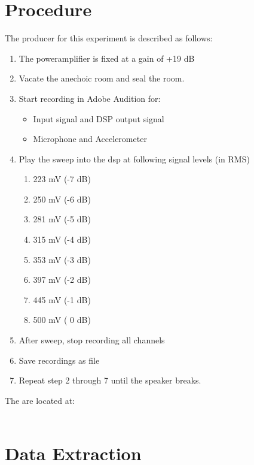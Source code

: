 \section{Procedure}\label{sec:SpeakerTestProcedure1}

The producer for this experiment is described as follows:
\vspace{-5mm}
\begin{enumerate}
\item The poweramplifier is fixed at a gain of +19 dB
\item Vacate the anechoic room and seal the room.
\item Start recording in Adobe Audition for:
\begin{itemize}
\item Input signal and DSP output signal
\item Microphone and Accelerometer
\end{itemize}
\item Play the sweep into the dsp at following signal levels (in RMS)
\begin{enumerate}
	\item 223 mV (-7 dB)
	\item 250 mV (-6 dB)
	\item 281 mV (-5 dB)
	\item 315 mV (-4 dB)
	\item 353 mV (-3 dB)
	\item 397 mV (-2 dB)
	\item 445 mV (-1 dB)
	\item 500 mV ( 0 dB) 
\end{enumerate}
\item After sweep, stop recording all channels
\item Save recordings as  file
\item Repeat step 2 through 7 until the speaker breaks.
\end{enumerate}

The  are located at:\\
\\


%



\section{Data Extraction}


